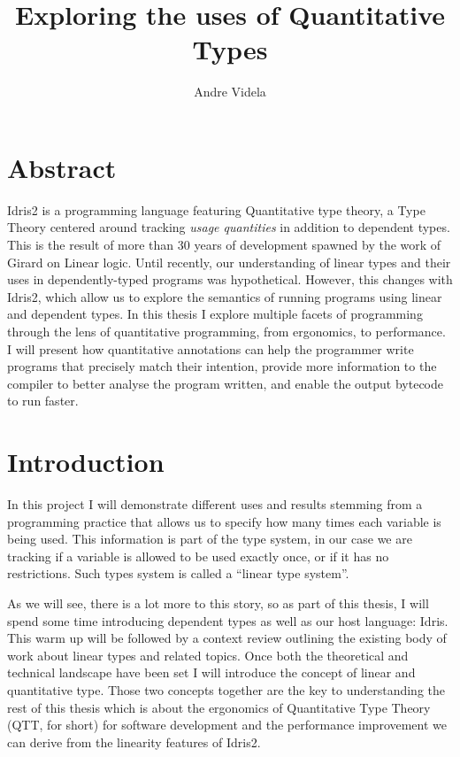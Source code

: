 \documentclass[
]{article}
\author{}
\date{}
\begin{document}
\title{Exploring the uses of Quantitative Types}
\author{Andre Videla}
\maketitle

\hypertarget{abstract}{%
\section{Abstract}\label{abstract}}

Idris2 is a programming language featuring Quantitative type theory, a
Type Theory centered around tracking \emph{usage quantities} in addition
to dependent types. This is the result of more than 30 years of
development spawned by the work of Girard on Linear logic. Until
recently, our understanding of linear types and their uses in
dependently-typed programs was hypothetical. However, this changes with
Idris2, which allow us to explore the semantics of running programs
using linear and dependent types. In this thesis I explore multiple
facets of programming through the lens of quantitative programming, from
ergonomics, to performance. I will present how quantitative annotations
can help the programmer write programs that precisely match their
intention, provide more information to the compiler to better analyse
the program written, and enable the output bytecode to run faster.

\newpage
\setcounter{secnumdepth}{2}
\tableofcontents
\newpage

\hypertarget{introduction}{%
\section{Introduction}\label{introduction}}

In this project I will demonstrate different uses and results stemming
from a programming practice that allows us to specify how many times
each variable is being used. This information is part of the type
system, in our case we are tracking if a variable is allowed to be used
exactly once, or if it has no restrictions. Such types system is called
a ``linear type system''.

As we will see, there is a lot more to this story, so as part of this
thesis, I will spend some time introducing dependent types as well as
our host language: Idris. This warm up will be followed by a context
review outlining the existing body of work about linear types and
related topics. Once both the theoretical and technical landscape have
been set I will introduce the concept of linear and quantitative type.
Those two concepts together are the key to understanding the rest of
this thesis which is about the ergonomics of Quantitative Type
Theory\cite{qtt}\cite{nuttin} (QTT, for short) for software development
and the performance improvement we can derive from the linearity
features of Idris2.
\end{document}
